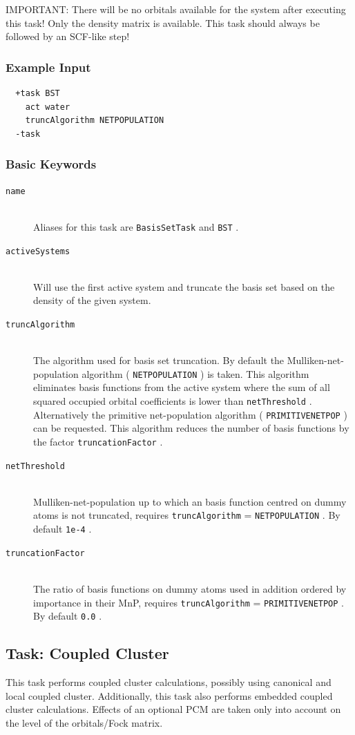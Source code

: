 \documentclass[bibliography=totocnumbered,a4paper,10pt,oneside]{scrbook}
\newcommand{\ttt}[1]{%
  \begingroup\setlength{\fboxsep}{1pt}%
  \colorbox{serenity-green!30}{\texttt{\hspace*{2pt}\vphantom{(g}#1\hspace*{2pt}}}%
  \endgroup
}
\begin{document}
{\color{red}IMPORTANT:} There will be no orbitals available for the system after executing this
task! Only the density matrix is available. This task should always be followed by an SCF-like step!
\subsubsection{Example Input}
\begin{lstlisting}
  +task BST
    act water
    truncAlgorithm NETPOPULATION
  -task
\end{lstlisting}
\subsubsection{Basic Keywords}
\begin{description}
  \item [\texttt{name}]\hfill \\
    Aliases for this task are \ttt{BasisSetTask} and \ttt{BST}.
  \item [\texttt{activeSystems}]\hfill \\
    Will use the first active system and truncate the basis set based on the density of the given system.
  \item [\texttt{truncAlgorithm}]\hfill \\
    The algorithm used for basis set truncation. By default the Mulliken-net-population
    algorithm (\ttt{NETPOPULATION}) is taken. This algorithm eliminates basis functions from the active
    system where the sum of all squared occupied orbital coefficients is lower than \ttt{netThreshold}.
    Alternatively the primitive net-population algorithm (\ttt{PRIMITIVENETPOP}) can be requested. This
    algorithm reduces the number of basis functions by the factor \ttt{truncationFactor}.
  \item[\texttt{netThreshold}] \hfill \\
    Mulliken-net-population up to which an basis function centred on dummy atoms is not truncated, requires
    \ttt{truncAlgorithm}=\ttt{NETPOPULATION}. By default \ttt{1e-4}.
  \item[\texttt{truncationFactor}] \hfill \\
    The ratio of basis functions on dummy atoms used in addition ordered by importance in their MnP, requires
    \ttt{truncAlgorithm}=\ttt{PRIMITIVENETPOP}. By default \ttt{0.0}.
\end{description}

\subsection{Task: Coupled Cluster}
This task performs coupled cluster calculations, possibly using canonical and local coupled cluster.
Additionally, this task also performs embedded coupled cluster calculations. Effects of an optional
PCM are taken only into account on the level of the orbitals/Fock matrix.
\end{document}
